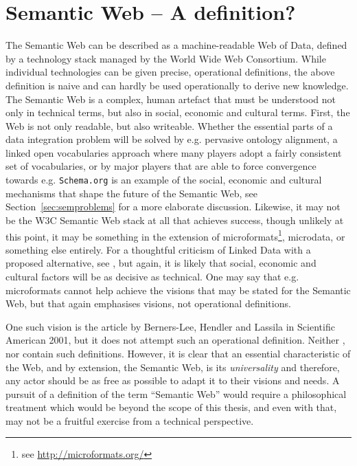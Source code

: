\section{Semantic Web -- A definition?}\label{sec:nodef}

The Semantic Web can be described as a machine-readable Web of Data,
defined by a technology stack managed by the World Wide Web
Consortium. While individual technologies can be given precise,
operational definitions, the above definition is naive and can hardly
be used operationally to derive new knowledge. The Semantic Web is a
complex, human artefact that must be understood not only in technical
terms, but also in social, economic and cultural terms. First, the Web
is not only readable, but also writeable. Whether the essential parts
of a data integration problem will be solved by e.g. pervasive
ontology alignment, a linked open vocabularies approach where many
players adopt a fairly consistent set of vocabularies, or by major
players that are able to force convergence towards e.g. \texttt{Schema.org}
is an example of the social, economic and cultural mechanisms that
shape the future of the Semantic Web, see
Section~\ref{sec:semproblems} for a more elaborate
discussion. Likewise, it may not be the W3C Semantic Web stack at all
that achieves success, though unlikely at this point, it may be
something in the extension of microformats\footnote{see
  \url{http://microformats.org/}}, microdata\cite{microdata}, or
something else entirely. For a thoughtful criticism of Linked Data
with a proposed alternative, see \cite{darobin1}, but again, it is
likely that social, economic and cultural factors will be as decisive
as technical. One may say that e.g. microformats cannot help achieve
the visions that may be stated for the Semantic Web, but that again
emphasises visions, not operational definitions.

One such vision is the article by Berners-Lee, Hendler and Lassila in
Scientific American 2001\cite{berners2001semantic}, but it does not attempt such an
operational definition. Neither \cite{semwebroadmap},
\cite{berners2000weaving} nor \cite{Allemang:2008:SWW:1386668} contain
such definitions. However, it is clear that an essential
characteristic of the Web, and by extension, the Semantic Web, is its
\emph{universality} and therefore, any actor should be as free as
possible to adapt it to their visions and needs. A pursuit of a
definition of the term ``Semantic Web'' would require a philosophical
treatment which would be beyond the scope of this thesis, and even
with that, may not be a fruitful exercise from a technical
perspective. 

